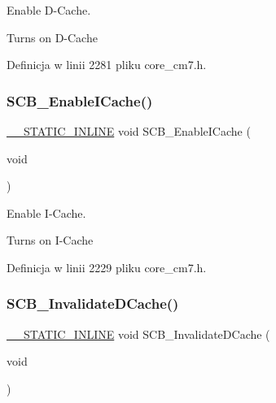 Enable D-\/\+Cache. 

Turns on D-\/\+Cache 

Definicja w linii 2281 pliku core\+\_\+cm7.\+h.

\mbox{\label{group___c_m_s_i_s___core___cache_functions_gaf9e7c6c8e16ada1f95e5bf5a03505b68}} 
\subsubsection{\texorpdfstring{S\+C\+B\+\_\+\+Enable\+I\+Cache()}{SCB\_EnableICache()}}
{\footnotesize\ttfamily \hyperlink{cmsis__iccarm_8h_aba87361bfad2ae52cfe2f40c1a1dbf9c}{\+\_\+\+\_\+\+S\+T\+A\+T\+I\+C\+\_\+\+I\+N\+L\+I\+NE} void S\+C\+B\+\_\+\+Enable\+I\+Cache (\begin{DoxyParamCaption}\item[{void}]{ }\end{DoxyParamCaption})}



Enable I-\/\+Cache. 

Turns on I-\/\+Cache 

Definicja w linii 2229 pliku core\+\_\+cm7.\+h.

\mbox{\label{group___c_m_s_i_s___core___cache_functions_gace2d30db08887d0bdb818b8a785a5ce6}} 
\subsubsection{\texorpdfstring{S\+C\+B\+\_\+\+Invalidate\+D\+Cache()}{SCB\_InvalidateDCache()}}
{\footnotesize\ttfamily \hyperlink{cmsis__iccarm_8h_aba87361bfad2ae52cfe2f40c1a1dbf9c}{\+\_\+\+\_\+\+S\+T\+A\+T\+I\+C\+\_\+\+I\+N\+L\+I\+NE} void S\+C\+B\+\_\+\+Invalidate\+D\+Cache (\begin{DoxyParamCaption}\item[{void}]{ }\end{DoxyParamCaption})}



